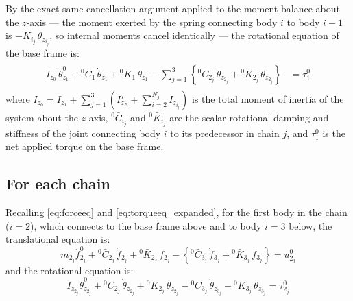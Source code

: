 By the exact same cancellation argument applied to the moment balance about the $z$-axis — the moment exerted by the spring connecting body $i$ to body $i-1$ is $-K_{i_j}\,\theta_{z_{i_j}}$, so internal moments cancel identically — the rotational equation of the base frame is:
\begin{align} \label{eq:baseframerot}
    \begin{split}
        I_{z_0}\,\ddot{\theta}^{0}_{z_1}
        + {}^0\bar{C}_1\,\dot{\theta}_{z_1}
        + {}^0\bar{K}_1\,\theta_{z_1}
        - \sum_{j=1}^{3}\left\{
            {}^0\bar{C}_{2_j}\,\dot{\theta}_{z_{2_j}}
            + {}^0\bar{K}_{2_j}\,\theta_{z_{2_j}}
        \right\}
        &= \tau^0_{1}
    \end{split}
\end{align}
where $I_{z_0} = I_{z_1} + \sum_{j=1}^{3}\!\left(I^j_{z_B} + \sum_{i=2}^{N_j} I_{z_{i_j}}\right)$ is the total moment of inertia of the system about the $z$-axis, ${}^0\bar{C}_{i_j}$ and ${}^0\bar{K}_{i_j}$ are the scalar rotational damping and stiffness of the joint connecting body $i$ to its predecessor in chain $j$, and $\tau^0_1$ is the net applied torque on the base frame.

\subsection{For each chain}

Recalling \eqref{eq:forceeq} and \eqref{eq:torqueeq_expanded}, for the first body in the chain ($i=2$), which connects to the base frame above and to body $i=3$ below, the translational equation is:
\begin{equation}
        \bar{m}_{2_j}
        \ddot{f}^{0}_{2_j}
        + {}^0\bar{C}_{2_j}\,\dot{f}_{2_j}
        + {}^0\bar{K}_{2_j}\,f_{2_j}
        - \left\{
            {}^0\bar{C}_{3_j}\,\dot{f}_{3_j} + {}^0\bar{K}_{3_j}\,f_{3_j}
        \right\}
        = u^0_{2_j}
\end{equation}
and the rotational equation is:
\begin{equation}
        I_{z_{2_j}}\ddot{\theta}^{0}_{z_{2_j}}
        + {}^0\bar{C}_{2_j}\,\dot{\theta}_{z_{2_j}}
        + {}^0\bar{K}_{2_j}\,\theta_{z_{2_j}}
        - {}^0\bar{C}_{3_j}\,\dot{\theta}_{z_{3_j}}
        - {}^0\bar{K}_{3_j}\,\theta_{z_{3_j}}
        = \tau^0_{2_j}
\end{equation}

